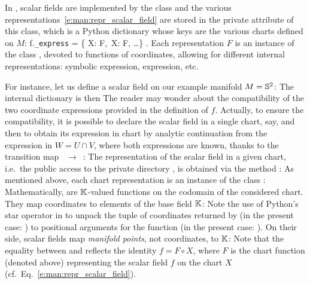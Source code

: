 In \Sage{}, scalar fields are implemented by the class
and the various representations~\eqref{e:man:repr_scalar_field} are
stored in the private attribute  of this class, which is a
Python dictionary
whose keys are the various charts defined on $M$:
\be \label{e:f_express}
 f.\mbox{\texttt{\_express}} = \left\{ X: F,\ \hat X: \hat F, \ldots \right\} .
\ee
Each representation $F$ is an instance of the class ,
devoted to functions of coordinates, allowing for different internal representations:
\Sage{} symbolic expression,  expression, etc.

For instance, let us define a scalar field on our example manifold $M=\mathbb{S}^2$:
The internal dictionary  is then
The reader may wonder about the compatibility of the two coordinate expressions
provided in the definition of $f$. Actually, to ensure the compatibility, it
is possible to declare the scalar field in a single chart,  say,
and then to obtain its expression in chart  by analytic continuation
from the expression in $W=U\cap V$, where both expressions are known, thanks
to the transition map ~$\to$~:
The representation of the scalar field in a given chart, i.e.\ the public access
to the private directory , is obtained via the method :
As mentioned above, each chart representation is an instance of the
class :
Mathematically,  are $\mathbb{K}$-valued functions on the codomain of
the considered chart. They map coordinates to elements of the base field $\mathbb{K}$:
Note the use of Python's star operator in  to unpack the tuple of coordinates
returned by  (in the present case: ) to positional arguments
for the function  (in the present case: ).
On their side, scalar fields map \emph{manifold points}, not coordinates, to $\mathbb{K}$:
Note that the equality between  and 
reflects the identity $f = F \circ X$, where $F$ is the chart function
(denoted  above)
representing the scalar field $f$ on the chart $X$
(cf.\ Eq.~\eqref{e:man:repr_scalar_field}).

